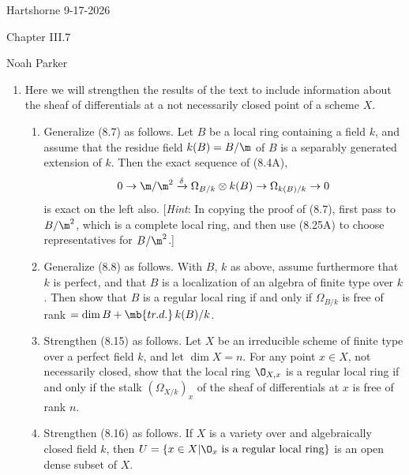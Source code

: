 \documentclass[12pt]{amsart}
\begin{document}
{Hartshorne} \hfill {9-17-2026}

\bigskip\bigskip

\begin{center}

{\sc Chapter III.7}

\end{center}

\begin{center}

  {Noah Parker} 
    
\end{center}

\bigskip\bigskip

\begin{enumerate}
  \item[II.8.1.] {
      Here we will strengthen the results of the text to include information about the sheaf of differentials at a not necessarily closed point of a scheme $X$.
      \begin{enumerate}
        \item Generalize (8.7) as follows.
          Let $B$ be a local ring containing a field $k$, and assume that the residue field $k(B)=B/\m$ of $B$ is a separably generated extension of $k$.
          Then the exact sequence of (8.4A),
          \[
            0\to \m/\m^2\xrightarrow\delta \Omega_{B/k}\otimes k(B)\to \Omega_{k(B)/k}\to 0
          \] 
          is exact on the left also.
          [\emph{Hint}: In copying the proof of (8.7), first pass to $B/\m^2$, which is a complete local ring, and then use (8.25A) to choose representatives for $B/\m^2$.]
        \item Generalize (8.8) as follows.
          With $B$, $k$ as above, assume furthermore that $k$ is perfect, and that $B$ is a localization of an algebra of finite type over $k$.
          Then show that $B$ is a regular local ring if and only if $\Omega_{B/k}$ is free of rank $=\dim B+\mb{tr.d.}\,k(B)/k$.
        \item Strengthen (8.15) as follows.
          Let $X$ be an irreducible scheme of finite type over a perfect field $k$, and let $\dim X=n$.
          For any point $x\in X$, not necessarily closed, show that the local ring $\O_{X,x}$ is a regular local ring if and only if the stalk $(\Omega_{X/k})_x$ of the sheaf of differentials at $x$ is free of rank $n$.
        \item Strengthen (8.16) as follows.
          If $X$ is a variety over and algebraically closed field $k$, then $U=\{x\in X|\O_x\textup{ is a regular local ring}\}$ is an open dense subset of $X$.
      \end{enumerate}
    }
\end{enumerate}
\end{document}
